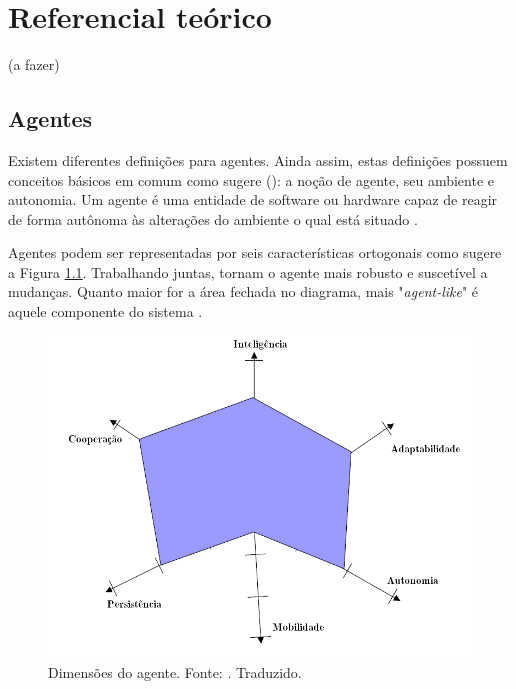 \chapter[Referencial teórico]{Referencial teórico}

(a fazer)

\section{Agentes}

Existem diferentes definições para agentes. Ainda assim, estas definições possuem conceitos básicos em comum como sugere \citeauthor{mcarthur2007multi} (\citeyear{mcarthur2007multi}): a noção de agente, seu ambiente e autonomia. Um agente é uma entidade de software ou hardware capaz de reagir de forma autônoma às alterações do ambiente o qual está situado .


Agentes podem ser representadas por seis características ortogonais como sugere a Figura \ref{fig:hexagono}. Trabalhando juntas, tornam o agente mais robusto e suscetível a mudanças. Quanto maior for a área fechada no diagrama, mais "\textit{agent-like}" é aquele componente do sistema \cite{griss2001software}.

\begin{figure}[h!]
    \includegraphics[scale=0.7]{figuras/hexagono_agente}
    \centering
    \caption{Dimensões do agente. Fonte: \cite{griss2001software}. Traduzido.}
    \label{fig:hexagono}
\end{figure}

